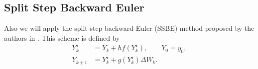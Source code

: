 \subsection*{Split Step Backward Euler}
	Also we will apply the split-step backward Euler (SSBE) method proposed by the authors in \cite{Higham2002b}. 
	This scheme is defined by  
	\begin{align}
		Y_k^{\star} &= Y_k + hf(Y^{\star}_k), \qquad Y_0 = y_0,
		\label{eqn:SSEM1}\\
		Y_{k+1}	&= Y_k^{\star} + g(Y_k^{\star})\Delta W_k \label{eqn:SSEM2}. 
	\end{align}
